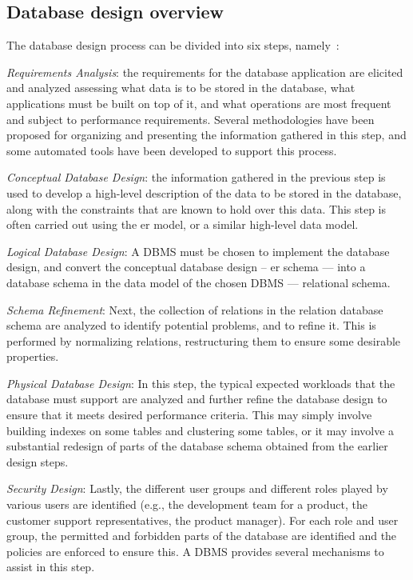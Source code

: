\subsection{Database design overview}
\label{sec:datab-design-overv}
%
The database design process can be divided into six steps, namely~\cite{ramakrishnan2003database}:
\begin{enum-c}
\item \emph{Requirements Analysis}:
  the requirements for the database
  application are elicited and analyzed assessing what data is to be stored in
  the database, what applications must be built on top of it, and what operations are most frequent and subject to performance
  requirements.
Several methodologies have been proposed for organizing and presenting the
information gathered in this step, and some automated tools have been developed
to support this process.
\item \emph{Conceptual Database Design}:
the information gathered in the previous step is used to develop a high-level
description of the data to be stored in the database, along with the constraints that are known to hold over this data. This
step is often carried out using the \gls{er} model, or a similar high-level data model.
\item \emph{Logical Database Design}:
  A DBMS must be chosen to implement the database
design, and convert the conceptual database design -- \gls{er} schema --- into a database schema in the
data model of the chosen DBMS --- relational schema.
\item \emph{Schema Refinement}:
  Next, the collection of relations in the relation database schema are analyzed
  to identify potential problems, and to refine it. This is performed by
  normalizing relations, restructuring them to ensure some desirable
  properties.
\item \emph{Physical Database Design}:
  In this step, the typical expected workloads that the database must support
  are analyzed and further refine the database design to ensure that it meets
  desired performance criteria. This may simply involve building indexes on some tables and clustering some tables, or it may involve a substantial
  redesign of parts of the database schema obtained from the earlier design steps.
\item \emph{Security Design}:
  Lastly, the different user groups and different
roles played by various users are identified (e.g., the development team for a
product, the customer support representatives, the product manager).
For each role and user group, the permitted and forbidden parts of the database
are identified and the policies are enforced to ensure this. A DBMS provides
several mechanisms to assist in this step.
\end{enum-c}
%

